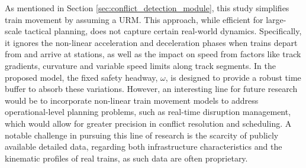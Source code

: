 \documentclass[Afour,sagev,times]{sagej}
\begin{document}
As mentioned in Section \ref{sec:conflict_detection_module}, this study simplifies train movement by assuming a \gls{URM}. This approach, while efficient for large-scale tactical planning, does not capture certain real-world dynamics. Specifically, it ignores the non-linear acceleration and deceleration phases when trains depart from and arrive at stations, as well as the impact on speed from factors like track gradients, curvature and variable speed limits along track segments. In the proposed model, the fixed safety headway, $\omega$, is designed to provide a robust time buffer to absorb these variations. However, an interesting line for future research would be to incorporate non-linear train movement models to address operational-level planning problems, such as real-time disruption management, which would allow for greater precision in conflict resolution and scheduling. A notable challenge in pursuing this line of research is the scarcity of publicly available detailed data, regarding both infrastructure characteristics and the kinematic profiles of real trains, as such data are often proprietary.
\end{document}
